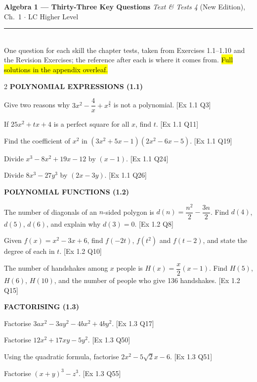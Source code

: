 \documentclass[11pt]{article}
\newcommand{\key}[1]{\hl{#1}}
\newcommand{\bk}[1]{{\footnotesize\color{greyish}[#1]}}
\begin{document}

{\color{lilacdeep}\large\bfseries Algebra 1 --- Thirty-Three Key Questions}\hfill
{\color{greyish}\footnotesize \textit{Text \& Tests 4} (New Edition), Ch.\ 1 $\cdot$ LC Higher Level}\\[-5pt]

\textcolor{lilacline}{\rule{\textwidth}{0.9pt}}\\[-6pt]

{\footnotesize One question for each skill the chapter tests, taken from Exercises 1.1--1.10 and the
Revision Exercises; the reference after each is where it comes from. \key{Full solutions in the appendix overleaf.}}

\begin{multicols}{2}
\small
{\color{lilacdeep}\footnotesize\bfseries POLYNOMIAL EXPRESSIONS (1.1)}
\begin{qlist}[font=\bfseries\color{lilacdeep}]
\item Give two reasons why $3x^{2}-\dfrac4x+x^{\frac32}$ is not a polynomial. \bk{Ex 1.1 Q3}
\item If $25x^{2}+tx+4$ is a perfect square for all $x$, find $t$. \bk{Ex 1.1 Q11}
\item Find the coefficient of $x^{2}$ in $(3x^{2}+5x-1)(2x^{2}-6x-5)$. \bk{Ex 1.1 Q19}
\item Divide $x^{3}-8x^{2}+19x-12$ by $(x-1)$. \bk{Ex 1.1 Q24}
\item Divide $8x^{3}-27y^{3}$ by $(2x-3y)$. \bk{Ex 1.1 Q26}
\end{qlist}

{\color{lilacdeep}\footnotesize\bfseries POLYNOMIAL FUNCTIONS (1.2)}
\begin{qlist}[resume]
\item The number of diagonals of an $n$-sided polygon is $d(n)=\dfrac{n^{2}}{2}-\dfrac{3n}{2}$. Find $d(4)$, $d(5)$, $d(6)$, and explain why $d(3)=0$. \bk{Ex 1.2 Q8}
\item Given $f(x)=x^{2}-3x+6$, find $f(-2t)$, $f(t^{2})$ and $f(t-2)$, and state the degree of each in $t$. \bk{Ex 1.2 Q10}
\item The number of handshakes among $x$ people is $H(x)=\dfrac x2(x-1)$. Find $H(5)$, $H(6)$, $H(10)$, and the number of people who give 136 handshakes. \bk{Ex 1.2 Q15}
\end{qlist}

{\color{lilacdeep}\footnotesize\bfseries FACTORISING (1.3)}
\begin{qlist}[resume]
\item Factorise $3ax^{2}-3ay^{2}-4bx^{2}+4by^{2}$. \bk{Ex 1.3 Q17}
\item Factorise $12x^{2}+17xy-5y^{2}$. \bk{Ex 1.3 Q50}
\item Using the quadratic formula, factorise $2x^{2}-5\sqrt2x-6$. \bk{Ex 1.3 Q51}
\item Factorise $(x+y)^{3}-z^{3}$. \bk{Ex 1.3 Q55}
\end{qlist}


\end{multicols}
\end{document}
